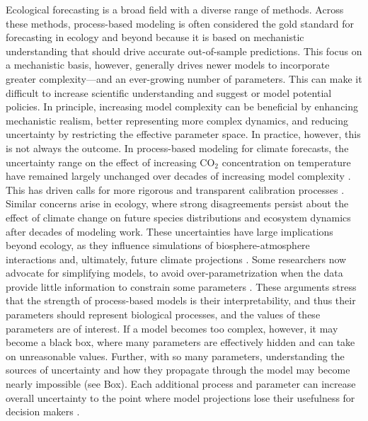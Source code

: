 \documentclass[11pt]{article}
\newcommand{\llabel}[1]{\hypertarget{lintarget:#1}{}\linelabel{lin:#1}}
\begin{document}
Ecological forecasting is a broad field with a diverse range of methods. Across these methods, process-based modeling is often considered the gold standard for forecasting in ecology \citep{Urban2016, Pilowsky2022} and beyond because it is based on mechanistic understanding that should drive accurate out-of-sample predictions.  
This focus on a mechanistic basis, however, generally drives newer models to incorporate greater complexity---and an ever-growing number of parameters. This can make it difficult to increase scientific understanding \citep{Franklin2020} and suggest or model potential policies. 
In principle, increasing model complexity can be beneficial by enhancing mechanistic realism, better representing more complex dynamics, and \llabel{quant2}reducing uncertainty by restricting the effective parameter space. In practice, however, this is not always the outcome. In process-based modeling for climate forecasts, the uncertainty range on the effect of increasing CO$_{2}$ concentration on temperature have remained largely unchanged over decades of increasing model complexity \citep{Zelinka2020}. This has driven calls for more rigorous and transparent calibration processes \citep{balaji2022general}. Similar concerns arise in ecology, where strong disagreements persist about the effect of climate change on future species distributions \citep{Cheaib2012} and ecosystem dynamics \citep{Lovenduski2017} after decades of modeling work.
These uncertainties have large implications beyond ecology, as they influence simulations of biosphere-atmosphere interactions and, ultimately, future climate projections \citep{Bonan2018, simpson2025confronting}.
Some researchers now advocate for simplifying models, to avoid over-parametrization when the data provide little information to constrain some parameters \citep{Wang2017, Harrison2021}. These arguments stress that the strength of process-based models is their interpretability, and thus their parameters should represent biological processes, and the values of these parameters are of interest.
If a model becomes too complex, however, it may become a black box, \llabel{blackbox}where many parameters are effectively hidden and can take on unreasonable values. 
Further, with so many parameters, understanding the sources of uncertainty and how they propagate through the model may become nearly impossible (see Box).
Each additional process and parameter can increase overall uncertainty to the point where model projections lose their usefulness for decision makers \citep{Saltelli2020}. 
\end{document}
